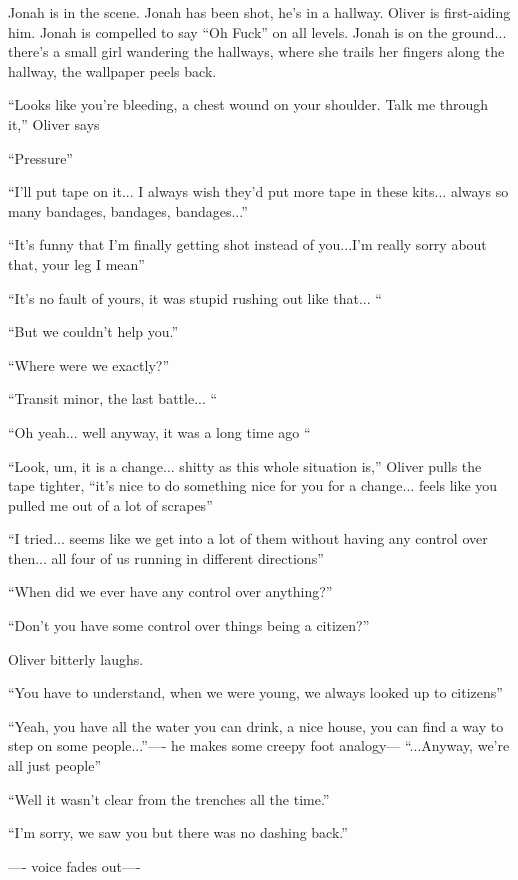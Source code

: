 
Jonah is in the scene.  Jonah has been shot, he's in a hallway.  Oliver is first-aiding him. Jonah is compelled to say ``Oh Fuck'' on all levels.  Jonah is on the ground... there's a small girl wandering the hallways, where she trails her fingers along the hallway, the wallpaper peels back. 

``Looks like you're bleeding, a chest wound on your shoulder.  Talk me through it,'' Oliver says

``Pressure''

``I'll put tape on it... I always wish they'd put more tape in these kits... always so many bandages, bandages, bandages...''

``It's funny that I'm finally getting shot instead of you...I'm really sorry about that, your leg I mean''

``It's no fault of yours, it was stupid rushing out like that... ``

``But we couldn't help you.''

``Where were we exactly?''

``Transit minor, the last battle...  ``

``Oh yeah... well anyway, it was a long time ago ``

``Look, um, it is a change... shitty as this whole situation is,'' Oliver pulls the tape tighter, ``it's nice to do something nice for you for a change... feels like you pulled me out of a lot of scrapes''

``I tried... seems like we get into a lot of them without having any control over then... all four of us running in different directions''

``When did we ever have any control over anything?''

``Don't you have some control over things being a citizen?''

Oliver bitterly laughs. 

``You have to understand, when we were young, we always looked up to citizens''

``Yeah, you have all the water you can drink, a nice house, you can find a way to step on some people...''---- he makes some creepy foot analogy--- ``...Anyway, we're all just people''

``Well it wasn't clear from the trenches all the time.''

``I'm sorry, we saw you but there was no dashing back.''

---- voice fades out----

